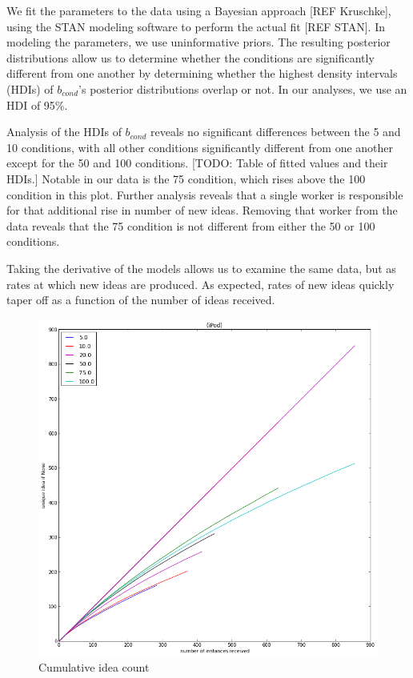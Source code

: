 We fit the parameters to the data using a Bayesian approach [REF Kruschke], using the STAN modeling software to perform the actual fit [REF STAN]. In modeling the parameters, we use uninformative priors. The resulting posterior distributions allow us to determine whether the conditions are significantly different from one another by determining whether the highest density intervals (HDIs) of $b_{cond}$'s posterior distributions overlap or not. In our analyses, we use an HDI of 95\%.

Analysis of the HDIs of $b_{cond}$ reveals no significant differences between the 5 and 10 conditions, with all other conditions significantly different from one another except for the 50 and 100 conditions. [TODO: Table of fitted values and their HDIs.] Notable in our data is the 75 condition, which rises above the 100 condition in this plot. Further analysis reveals that a single worker is responsible for that additional rise in number of new ideas. Removing that worker from the data reveals that the 75 condition is not different from either the 50 or 100 conditions.

Taking the derivative of the models allows us to examine the same data, but as rates at which new ideas are produced. As expected, rates of new ideas quickly taper off as a function of the number of ideas received.

\begin{figure}[h!]
    \centering
    \includegraphics[width=0.9\columnwidth]{ideas_over_time}
    \caption{Cumulative idea count}
\end{figure}

